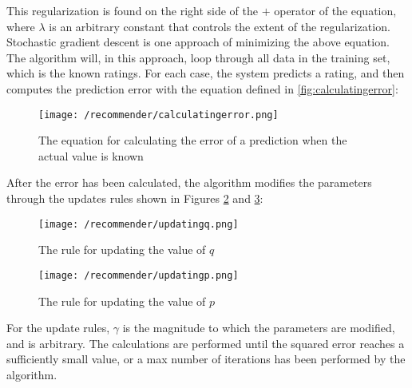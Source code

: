  This regularization is found on the right side of the $+$ operator of the equation, where $\lambda$ is an arbitrary constant that controls the extent of the regularization.
 Stochastic gradient descent is one approach of minimizing the above equation.
 The algorithm will, in this approach, loop through all data in the training set, which is the known ratings.
 For each case, the system predicts a rating, and then computes the prediction error with the equation defined in \autoref{fig:calculatingerror}:
 \begin{figure}[H]
    \centering
    \texttt{[image: /recommender/calculatingerror.png]}
     \caption{The equation for calculating the error of a prediction when the actual value is known}
     \label{fig:calculatingerror}
 \end{figure}
 \noindent
 After the error has been calculated, the algorithm modifies the parameters through the updates rules shown in Figures \ref{fig:updatingq} and \ref{fig:updatingp}:
 \begin{figure}[H]
    \centering
    \texttt{[image: /recommender/updatingq.png]}
     \caption{The rule for updating the value of $q$}
     \label{fig:updatingq}
 \end{figure}
 \noindent
 
 \begin{figure}[H]
    \centering
    \texttt{[image: /recommender/updatingp.png]}
     \caption{The rule for updating the value of $p$}
     \label{fig:updatingp}
 \end{figure}
 \noindent
 For the update rules, $\gamma$ is the magnitude to which the parameters are modified, and is arbitrary.
 The calculations are performed until the squared error reaches a sufficiently small value, or a max number of iterations has been performed by the algorithm.
 
